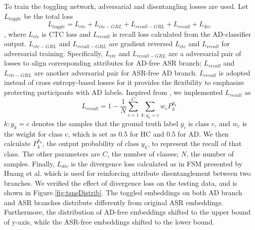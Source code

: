 \documentclass[lettersize,journal]{IEEEtran}
\begin{document}
To train the toggling network, adversarial and disentangling losses are used. Let $L_{toggle}$ be the total loss
\begin{equation}
L_{toggle} = L_{ctc}+ L_{ctc-GRL} + L_{recall-GRL} + L_{recall}  + L_{div}
\end{equation}
, where $L_{ctc}$ is CTC loss and $L_{recall}$ is recall loss calculated from the AD-classifier output. $L_{ctc-GRL}$ and $L_{recall-GRL}$ are gradient reversed $L_{ctc}$ and $L_{recall}$ for adversarial training. Specifically, $L_{ctc}$ and $L_{recall-GRL}$ are a adversarial pair of losses to align corresponding attributes for AD-free ASR branch; $L_{recall}$ and $L_{ctc-GRL}$ are another adversarial pair for ASR-free AD branch.
$L_{recall}$ is adopted instead of cross entropy-based losses for it provides the flexibility to emphasize protecting participants with AD labels. Inspired from \cite{tian2021recall}, we implemented $L_{recall}$ as \begin{equation}
L_{recall} = 1-\frac{1}{N}\sum_{c=1}^{C}\sum_{k:y_k=c}w_cP_k^{y_k}
\end{equation}
$k:y_{k}=c$ denotes the samples that the ground truth label $y_{i}$ is class c, and $w_c$ is the weight for class c, which is set as 0.5 for HC and 0.5 for AD. We then calculate $P_k^{y_k}$, the output probability of class $y_{k}$, to represent the recall of that class. The other parameters are $C$, the number of classes; $N$, the number of samples. Finally, $L_{div}$ is the divergence loss calculated as in FSM presented by Huang et al. \cite{huang2022attention} which is used for reinforcing attribute disentanglement between two branches. 
We verified the effect of divergence loss on the testing data, and is shown in Figure.\ref{fig:tsneDistrib}. The toggled embeddings on both AD branch and ASR branches distribute differently from original ASR embeddings. Furthermore, the distribution of AD-free embeddings shifted to the upper bound of y-axis, while the ASR-free embeddings shifted to the lower bound. 
\end{document}
